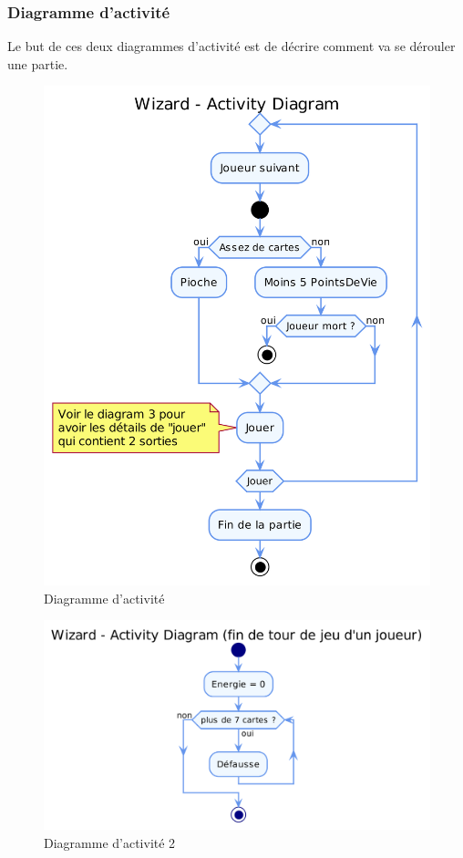 \documentclass[11pt,a4paper]{article}
\begin{document}
\subsubsection{Diagramme d'activité}
Le but de ces deux diagrammes d'activité est de décrire comment va se dérouler une partie.
\begin{figure}[ht]
  \centering
  \includegraphics[width=1\textwidth]{../uml_files/ActivityDiagram.png}
  \caption{\label{fig:act1} Diagramme d'activité}
\end{figure}

\begin{figure}[ht]
  \centering
  \includegraphics[width=1\textwidth]{../uml_files/ActivityDiagram2.png}
  \caption{\label{fig:act2} Diagramme d'activité 2}
\end{figure}

\clearpage
\printindex
\end{document}
